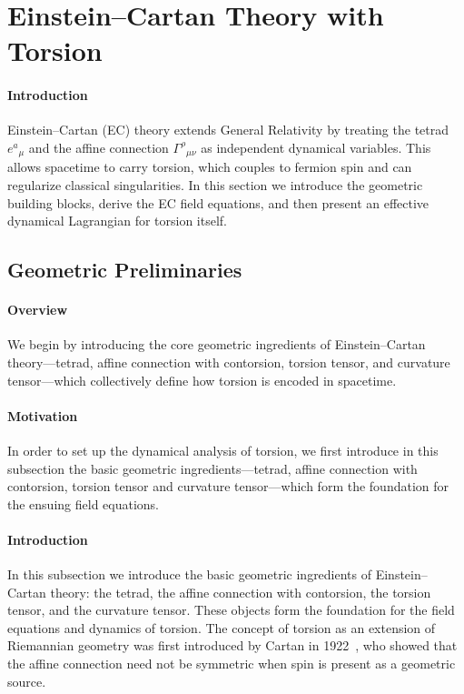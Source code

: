 \documentclass{article}
\begin{document}



\section{Einstein–Cartan Theory with Torsion}
\label{sec:EC-torsion}

\paragraph{Introduction}
Einstein–Cartan (EC) theory extends General Relativity by treating the tetrad $e^a{}_\mu$ and the affine connection $\Gamma^\rho{}_{\mu\nu}$ as independent dynamical variables.  This allows spacetime to carry torsion, which couples to fermion spin and can regularize classical singularities.  In this section we introduce the geometric building blocks, derive the EC field equations, and then present an effective dynamical Lagrangian for torsion itself.


\subsection{Geometric Preliminaries}

\paragraph{Overview}
We begin by introducing the core geometric ingredients of Einstein–Cartan theory—tetrad, affine connection with contorsion, torsion tensor, and curvature tensor—which collectively define how torsion is encoded in spacetime.


\label{sec:EC-geom}
\paragraph{Motivation}
In order to set up the dynamical analysis of torsion, we first introduce in this subsection the basic geometric ingredients—tetrad, affine connection with contorsion, torsion tensor and curvature tensor—which form the foundation for the ensuing field equations.


\paragraph{Introduction}
In this subsection we introduce the basic geometric ingredients of Einstein–Cartan theory: the tetrad, the affine connection with contorsion, the torsion tensor, and the curvature tensor. These objects form the foundation for the field equations and dynamics of torsion.
The concept of torsion as an extension of Riemannian geometry was first introduced by Cartan in 1922~\cite{cartan1922}, who showed that the affine connection need not be symmetric when spin is present as a geometric source.
\end{document}
